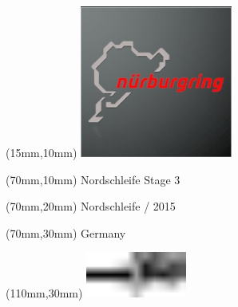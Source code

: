 \null\newpage
\begin{textblock*}{50mm}(15mm,10mm)%
\includegraphics[width=50mm]{LG/2015-05-20_00088.png}
\end{textblock*}
\begin{textblock*}{130mm}(70mm,10mm)%
{\fontsize{20}{20}\selectfont Nordschleife Stage 3}\\
\end{textblock*}
\begin{textblock*}{120mm}(70mm,20mm)%
{\fontsize{16}{16}\selectfont Nordschleife / 2015}\\
\end{textblock*}
\begin{textblock*}{120mm}(70mm,30mm)%
{\fontsize{12}{12}\selectfont Germany}
\end{textblock*}
\begin{textblock*}{30mm}(110mm,30mm)%
\centering
\includegraphics[height=15mm]{icons/tofinish.pdf}
\end{textblock*}

